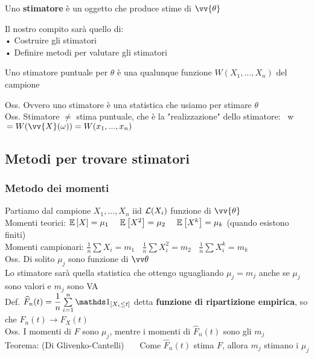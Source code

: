 
\begin{defi}
    Uno \textbf{stimatore} è un oggetto che produce stime di $\vv{\theta}$
\end{defi}

Il nostro compito sarà quello di:\\
• Costruire gli stimatori\\
• Definire metodi per valutare gli stimatori\\

\begin{defi}
    Uno stimatore puntuale per $\theta$ è una qualunque funzione $W(X_1,...,X_n)$  del campione
\end{defi}

Oss. Ovvero uno stimatore è una statistica che usiamo per stimare $\theta$\\

Oss. Stimatore $\neq$ stima puntuale, che è la "realizzazione" dello stimatore: \ w$\, =W(\vv{X}(\omega))=W(x_1,...,x_n)$ \\

\subsection{Metodi per trovare stimatori}

\subsubsection{Metodo dei momenti} 

Partiamo dal campione $X_1,...,X_n$ iid $\mathcal L(X_i)$ funzione di $\vv{\theta}$\\
Momenti teorici: $\E{X}=\mu_1 \ \ \ \ \E{X^2}=\mu_2 \ \ \ \ \E{X^k}=\mu_k$ (quando esistono finiti)\\
Momenti campionari: $\frac{1}{n}\sum X_i= m_1 \ \ \ \ \frac{1}{n}\sum X_i^2 =m_2 \ \ \ \ \frac{1}{n}\sum X_i^k=m_k$\\

Oss. Di solito $\mu_j$ sono funzione di $\vt$\\



Lo stimatore sarà quella statistica che ottengo uguagliando $\mu_j=m_j$ anche se $\mu_j$ sono valori e $m_j$ sono VA\\

Def. $\widehat{F}_n(t)=\frac{1}{n}\Sum{i=1}{n}\II_{[X_i\le t]}$ detta \textbf{funzione di ripartizione empirica}, so che $\widehat{F}_n(t) \to F_X(t)$\\
Oss. I momenti di $F$ sono $\mu_j$, mentre i momenti di $\widehat{F}_n(t)$ sono gli $m_j$\\
Teorema: (Di Glivenko-Cantelli) \ \ \
Come $\widehat{F}_n(t)$ stima $F$, allora $m_j$ stimano i $\mu_j$\\

